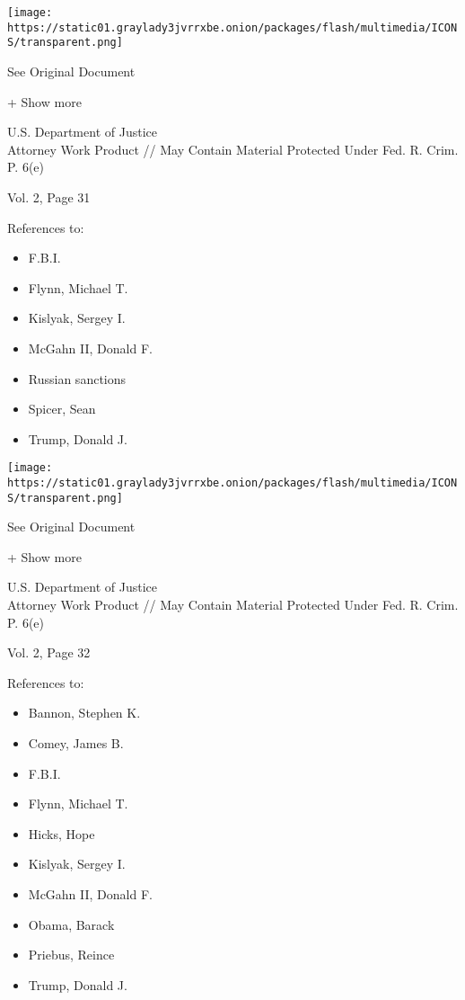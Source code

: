 \protect\hyperlink{}{}

\texttt{[image: https://static01.graylady3jvrrxbe.onion/packages/flash/multimedia/ICONS/transparent.png]}

See Original Document

+ Show more

U.S. Department of Justice\\
Attorney Work Product // May Contain Material Protected Under Fed. R.
Crim. P. 6(e)

Vol. 2, Page 31

References to:

\begin{itemize}
\tightlist
\item
  F.B.I.
\item
  Flynn, Michael T.
\item
  Kislyak, Sergey I.
\item
  McGahn II, Donald F.
\item
  Russian sanctions
\item
  Spicer, Sean
\item
  Trump, Donald J.
\end{itemize}

\protect\hyperlink{}{}

\texttt{[image: https://static01.graylady3jvrrxbe.onion/packages/flash/multimedia/ICONS/transparent.png]}

See Original Document

+ Show more

U.S. Department of Justice\\
Attorney Work Product // May Contain Material Protected Under Fed. R.
Crim. P. 6(e)

Vol. 2, Page 32

References to:

\begin{itemize}
\tightlist
\item
  Bannon, Stephen K.
\item
  Comey, James B.
\item
  F.B.I.
\item
  Flynn, Michael T.
\item
  Hicks, Hope
\item
  Kislyak, Sergey I.
\item
  McGahn II, Donald F.
\item
  Obama, Barack
\item
  Priebus, Reince
\item
  Trump, Donald J.
\end{itemize}


